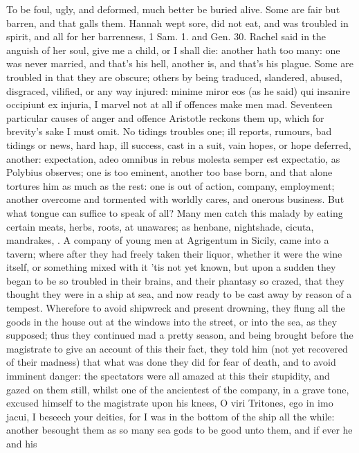 {To be foul, ugly, and deformed, much better be buried alive. Some are
fair but barren, and that galls them. Hannah wept sore, did not eat,
and was troubled in spirit, and all for her barrenness, 1 Sam. 1. and
Gen. 30. Rachel said in the anguish of her soul, give me a child, or I
shall die: another hath too many: one was never married, and that's his
hell, another is, and that's his plague. Some are troubled in that they
are obscure; others by being traduced, slandered, abused, disgraced,
vilified, or any way injured: minime miror eos (as he said) qui
insanire occipiunt ex injuria, I marvel not at all if offences make men
mad. Seventeen particular causes of anger and offence Aristotle reckons
them up, which for brevity's sake I must omit. No tidings troubles one;
ill reports, rumours, bad tidings or news, hard hap, ill success, cast
in a suit, vain hopes, or hope deferred, another: expectation, adeo
omnibus in rebus molesta semper est expectatio, as Polybius
observes; one is too eminent, another too base born, and that alone
tortures him as much as the rest: one is out of action, company,
employment; another overcome and tormented with worldly cares, and
onerous business. But what tongue can suffice to speak of all?
Many men catch this malady by eating certain meats, herbs, roots, at
unawares; as henbane, nightshade, cicuta, mandrakes, \etc{}. A
company of young men at Agrigentum in Sicily, came into a tavern; where
after they had freely taken their liquor, whether it were the wine
itself, or something mixed with it 'tis not yet known, but upon a
sudden they began to be so troubled in their brains, and their phantasy
so crazed, that they thought they were in a ship at sea, and now ready
to be cast away by reason of a tempest. Wherefore to avoid shipwreck
and present drowning, they flung all the goods in the house out at the
windows into the street, or into the sea, as they supposed; thus they
continued mad a pretty season, and being brought before the magistrate
to give an account of this their fact, they told him (not yet recovered
of their madness) that what was done they did for fear of death, and to
avoid imminent danger: the spectators were all amazed at this their
stupidity, and gazed on them still, whilst one of the ancientest of the
company, in a grave tone, excused himself to the magistrate upon his
knees, O viri Tritones, ego in imo jacui, I beseech your deities, \etc{}
for I was in the bottom of the ship all the while: another besought
them as so many sea gods to be good unto them, and if ever he and his
}
